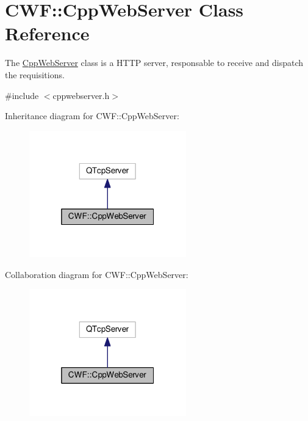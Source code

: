 \hypertarget{class_c_w_f_1_1_cpp_web_server}{\section{C\+W\+F\+:\+:Cpp\+Web\+Server Class Reference}
\label{class_c_w_f_1_1_cpp_web_server}
}


The \hyperlink{class_c_w_f_1_1_cpp_web_server}{Cpp\+Web\+Server} class is a H\+T\+T\+P server, responsable to receive and dispatch the requisitions.  




{\ttfamily \#include $<$cppwebserver.\+h$>$}



Inheritance diagram for C\+W\+F\+:\+:Cpp\+Web\+Server\+:
\nopagebreak
\begin{figure}[H]
\begin{center}
\leavevmode
\includegraphics[width=193pt]{class_c_w_f_1_1_cpp_web_server__inherit__graph}
\end{center}
\end{figure}


Collaboration diagram for C\+W\+F\+:\+:Cpp\+Web\+Server\+:
\nopagebreak
\begin{figure}[H]
\begin{center}
\leavevmode
\includegraphics[width=193pt]{class_c_w_f_1_1_cpp_web_server__coll__graph}
\end{center}
\end{figure}
